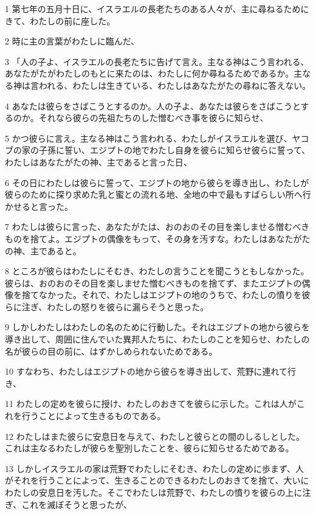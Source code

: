 \par 1 第七年の五月十日に、イスラエルの長老たちのある人々が、主に尋ねるためにきて、わたしの前に座した。
\par 2 時に主の言葉がわたしに臨んだ、
\par 3 「人の子よ、イスラエルの長老たちに告げて言え。主なる神はこう言われる、あなたがたがわたしのもとに来たのは、わたしに何か尋ねるためであるか。主なる神は言われる、わたしは生きている、わたしはあなたがたの尋ねに答えない。
\par 4 あなたは彼らをさばこうとするのか。人の子よ、あなたは彼らをさばこうとするのか。それなら彼らの先祖たちのした憎むべき事を彼らに知らせ、
\par 5 かつ彼らに言え。主なる神はこう言われる、わたしがイスラエルを選び、ヤコブの家の子孫に誓い、エジプトの地でわたし自身を彼らに知らせ彼らに誓って、わたしはあなたがたの神、主であると言った日、
\par 6 その日にわたしは彼らに誓って、エジプトの地から彼らを導き出し、わたしが彼らのために探り求めた乳と蜜との流れる地、全地の中で最もすばらしい所へ行かせると言った。
\par 7 わたしは彼らに言った、あなたがたは、おのおのその目を楽しませる憎むべきものを捨てよ。エジプトの偶像をもって、その身を汚すな。わたしはあなたがたの神、主であると。
\par 8 ところが彼らはわたしにそむき、わたしの言うことを聞こうともしなかった。彼らは、おのおのその目を楽しませた憎むべきものを捨てず、またエジプトの偶像を捨てなかった。それで、わたしはエジプトの地のうちで、わたしの憤りを彼らに注ぎ、わたしの怒りを彼らに漏らそうと思った。
\par 9 しかしわたしはわたしの名のために行動した。それはエジプトの地から彼らを導き出して、周囲に住んでいた異邦人たちに、わたしのことを知らせ、わたしの名が彼らの目の前に、はずかしめられないためである。
\par 10 すなわち、わたしはエジプトの地から彼らを導き出して、荒野に連れて行き、
\par 11 わたしの定めを彼らに授け、わたしのおきてを彼らに示した。これは人がこれを行うことによって生きるものである。
\par 12 わたしはまた彼らに安息日を与えて、わたしと彼らとの間のしるしとした。これは主なるわたしが彼らを聖別したことを、彼らに知らせるためである。
\par 13 しかしイスラエルの家は荒野でわたしにそむき、わたしの定めに歩まず、人がそれを行うことによって、生きることのできるわたしのおきてを捨て、大いにわたしの安息日を汚した。そこでわたしは荒野で、わたしの憤りを彼らの上に注ぎ、これを滅ぼそうと思ったが、
